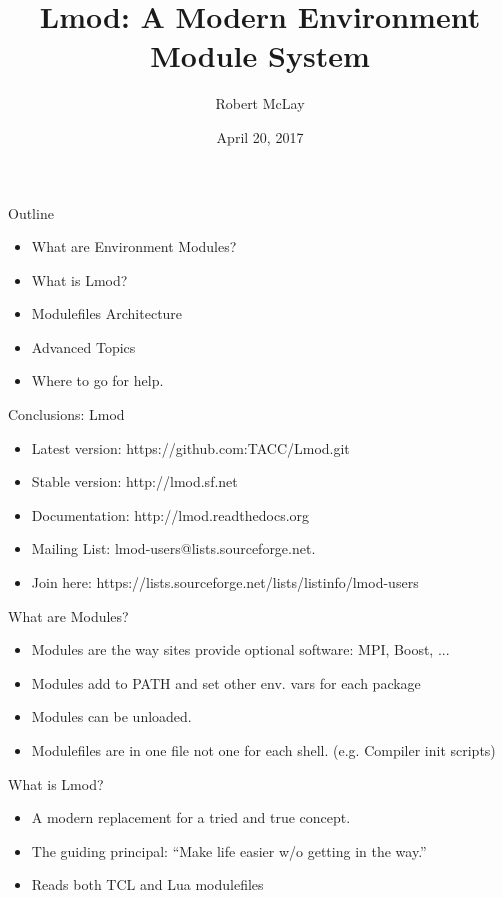 \documentclass[dvipsnames,aspectratio=169]{beamer}
\begin{document}
\title[Lmod]{Lmod: A Modern Environment Module System}
\author{Robert McLay} 
\date{April 20, 2017} 



\frame{\titlepage} 

\begin{frame}{Outline}
  \begin{itemize}
    \item What are Environment Modules?
    \item What is Lmod?
    \item Modulefiles Architecture
    \item Advanced Topics
    \item Where to go for help.
  \end{itemize}
\end{frame}

\begin{frame}{Conclusions: Lmod}
  \begin{itemize}
    \item Latest version: https://github.com:TACC/Lmod.git
    \item Stable version: http://lmod.sf.net
    \item Documentation:  http://lmod.readthedocs.org
    \item Mailing List:   lmod-users@lists.sourceforge.net.
    \item Join here: https://lists.sourceforge.net/lists/listinfo/lmod-users
  \end{itemize}
\end{frame}

\begin{frame}{What are Modules?}
  \begin{itemize}
    \item Modules are the way sites provide optional software: MPI,
      Boost, ...
    \item Modules add to PATH and set other env. vars for each package
    \item Modules can be unloaded.
    \item Modulefiles are in one file not one for each shell. (e.g. Compiler init scripts)
  \end{itemize}
\end{frame}

\begin{frame}{What is Lmod?}
  \begin{itemize}
    \item A modern replacement for a tried and true concept.
    \item The guiding principal: ``Make life easier w/o getting in
      the way.''
    \item Reads both TCL and Lua modulefiles
  \end{itemize}
\end{frame}
\end{document}
